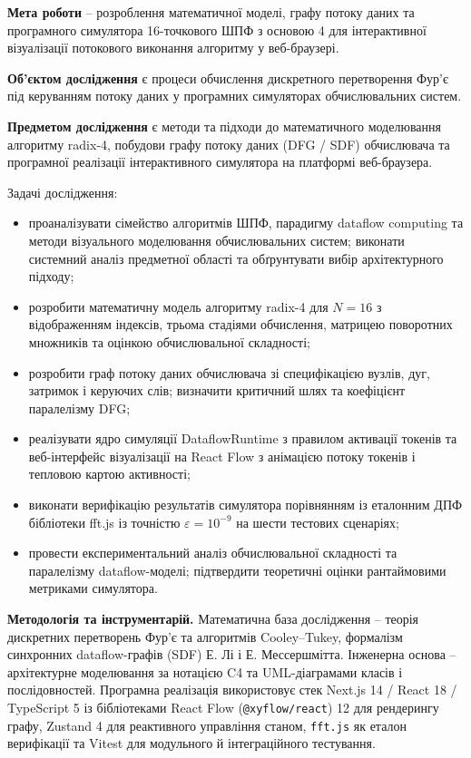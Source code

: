 \documentclass[
]{article}
\newcommand{\passthrough}[1]{#1}
\begin{document}
\textbf{Мета роботи} -- розроблення математичної моделі, графу потоку
даних та програмного симулятора 16-точкового ШПФ з основою 4 для
інтерактивної візуалізації потокового виконання алгоритму у
веб-браузері.

\textbf{Об'єктом дослідження} є процеси обчислення дискретного
перетворення Фур'є під керуванням потоку даних у програмних симуляторах
обчислювальних систем.

\textbf{Предметом дослідження} є методи та підходи до математичного
моделювання алгоритму radix-4, побудови графу потоку даних (DFG / SDF)
обчислювача та програмної реалізації інтерактивного симулятора на
платформі веб-браузера.

Задачі дослідження:

\begin{itemize}
\item
  проаналізувати сімейство алгоритмів ШПФ, парадигму dataflow computing
  та методи візуального моделювання обчислювальних систем; виконати
  системний аналіз предметної області та обґрунтувати вибір
  архітектурного підходу;
\item
  розробити математичну модель алгоритму radix-4 для \(N = 16\) з
  відображенням індексів, трьома стадіями обчислення, матрицею
  поворотних множників та оцінкою обчислювальної складності;
\item
  розробити граф потоку даних обчислювача зі специфікацією вузлів, дуг,
  затримок і керуючих слів; визначити критичний шлях та коефіцієнт
  паралелізму DFG;
\item
  реалізувати ядро симуляції DataflowRuntime з правилом активації
  токенів та веб-інтерфейс візуалізації на React Flow з анімацією потоку
  токенів і тепловою картою активності;
\item
  виконати верифікацію результатів симулятора порівнянням із еталонним
  ДПФ бібліотеки fft.js із точністю \(\varepsilon = 10^{- 9}\) на шести
  тестових сценаріях;
\item
  провести експериментальний аналіз обчислювальної складності та
  паралелізму dataflow-моделі; підтвердити теоретичні оцінки
  рантаймовими метриками симулятора.
\end{itemize}

\textbf{Методологія та інструментарій.} Математична база дослідження --
теорія дискретних перетворень Фур'є та алгоритмів Cooley--Tukey,
формалізм синхронних dataflow-графів (SDF) Е. Лі і Е. Мессершмітта.
Інженерна основа -- архітектурне моделювання за нотацією C4 та
UML-діаграмами класів і послідовностей. Програмна реалізація
використовує стек Next.js 14 / React 18 / TypeScript 5 із бібліотеками
React Flow
(\passthrough{\lstinline!@!}\passthrough{\lstinline!xyflow!}\passthrough{\lstinline!/!}\passthrough{\lstinline!react!})
12 для рендерингу графу, Zustand 4 для реактивного управління станом,
\passthrough{\lstinline!fft!}\passthrough{\lstinline!.!}\passthrough{\lstinline!js!}
як еталон верифікації та Vitest для модульного й інтеграційного
тестування.
\end{document}
